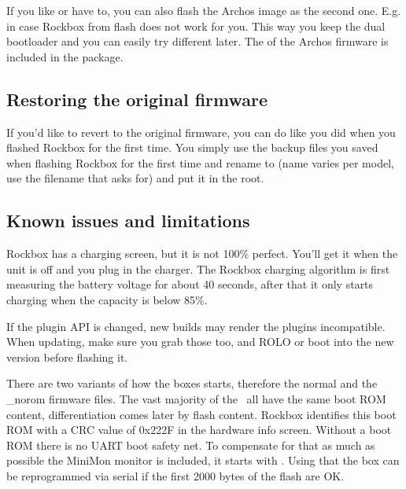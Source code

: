 If you like or have to, you can also flash the Archos image as the second one. 
E.g. in case Rockbox from flash does not work for you. This way you keep the dual 
bootloader and you can easily try different later. The  of the Archos
firmware is included in the package.

\subsection{Restoring the original firmware}
If you'd like to revert to the original firmware, you can do like you did when 
you flashed Rockbox for the first time. You simply use the backup files you saved
when flashing Rockbox for the first time and rename  to  (name varies per model, use the filename that  asks for) and put it in the root.

\subsection{Known issues and limitations}
Rockbox has a charging screen, but it is not 100\% perfect. You'll get it when 
the unit is off and you plug in the charger. The Rockbox charging algorithm is 
first measuring the battery voltage for about 40 seconds, after that it only 
starts charging when the capacity is below 85\%. 

If the plugin API is changed, new builds may render the plugins incompatible. 
When updating, make sure you grab those too, and ROLO or  boot into the 
new version before flashing it.

There are two variants of how the boxes starts, therefore the normal and the 
\_norom firmware files. The vast majority of the \daps\ all have the same boot 
ROM content, differentiation comes later by flash content. Rockbox identifies 
this boot ROM with a CRC value of 0x222F in the hardware info screen. 
Without a boot ROM  there is no UART boot safety net. To compensate for that as 
much as possible the MiniMon monitor is included, it starts with .
Using that the box can be reprogrammed via serial if the first 2000 bytes of the
flash are OK.


